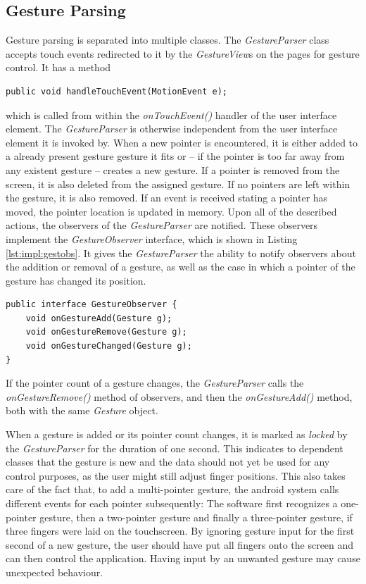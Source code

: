 \subsection{Gesture Parsing}

Gesture parsing is separated into multiple classes. The \textit{GestureParser} class accepts touch events redirected to it by the \textit{GestureView}s on the pages for gesture control. It has a method 
\begin{lstlisting}
public void handleTouchEvent(MotionEvent e);
\end{lstlisting}
which is called from within the \textit{onTouchEvent()} handler of the user interface element. The \textit{GestureParser} is otherwise independent from the user interface element it is invoked by. When a new pointer is encountered, it is either added to a already present gesture gesture it fits or -- if the pointer is too far away from any existent gesture -- creates a new gesture. If a pointer is removed from the screen, it is also deleted from the assigned gesture. If no pointers are left within the gesture, it is also removed. If an event is received stating a pointer has moved, the pointer location is updated in memory. Upon all of the described actions, the observers of the \textit{GestureParser} are notified. These observers implement the \textit{GestureObserver} interface, which is shown in Listing \ref{lst:impl:gestobs}. It gives the \textit{GestureParser} the ability to notify observers about the addition or removal of a gesture, as well as the case in which a pointer of the gesture has changed its position. 

\begin{lstlisting}[caption={The GestureObserver interface}, label=lst:impl:gestobs]
public interface GestureObserver {
	void onGestureAdd(Gesture g);
	void onGestureRemove(Gesture g);
	void onGestureChanged(Gesture g);
}
\end{lstlisting}

If the pointer count of a gesture changes, the \textit{GestureParser} calls the \textit{onGestureRemove()} method of observers, and then the \textit{onGestureAdd()} method, both with the same \textit{Gesture} object.

When a gesture is added or its pointer count changes, it is marked as \textit{locked} by the \textit{GestureParser} for the duration of one second. This indicates to dependent classes that the gesture is new and the data should not yet be used for any control purposes, as the user might still adjust finger positions. This also takes care of the fact that, to add a multi-pointer gesture, the android system calls different events for each pointer subsequently: The software first recognizes a one-pointer gesture, then a two-pointer gesture and finally a three-pointer gesture, if three fingers were laid on the touchscreen. By ignoring gesture input for the first second of a new gesture, the user should have put all fingers onto the screen and can then control the application. Having input by an unwanted gesture may cause unexpected behaviour. 

